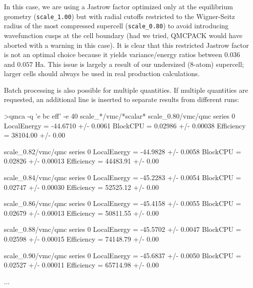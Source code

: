 In this case, we are using a Jastrow factor optimized only at the 
equilibrium geometry (\texttt{scale\_1.00}) but with radial 
cutoffs restricted to the Wigner-Seitz radius of the most compressed 
supercell (\texttt{scale\_0.80}) to avoid introducing wavefunction 
cusps at the cell boundary (had we tried, QMCPACK would have aborted with a warning in 
this case).  It is clear that this restricted Jastrow factor 
is not an optimal choice because it yields variance/energy ratios between $0.036$ 
and $0.057$ Ha.  This issue is largely a result of our undersized (8-atom) 
supercell; larger cells should always be used in real production 
calculations.

Batch processing is also possible for multiple quantities.  If multiple 
quantities are requested, an additional line is inserted to separate 
results from different runs:
\begin{shade}
>qmca -q 'e bc eff' -e 40 scale_*/vmc/*scalar*
scale_0.80/vmc/qmc  series 0 
  LocalEnergy           =          -44.6710 +/-           0.0061 
  BlockCPU              =           0.02986 +/-          0.00038 
  Efficiency            =          38104.00 +/-             0.00 

scale_0.82/vmc/qmc  series 0 
  LocalEnergy           =          -44.9828 +/-           0.0058 
  BlockCPU              =           0.02826 +/-          0.00013 
  Efficiency            =          44483.91 +/-             0.00 

scale_0.84/vmc/qmc  series 0 
  LocalEnergy           =          -45.2283 +/-           0.0054 
  BlockCPU              =           0.02747 +/-          0.00030 
  Efficiency            =          52525.12 +/-             0.00 

scale_0.86/vmc/qmc  series 0 
  LocalEnergy           =          -45.4158 +/-           0.0055 
  BlockCPU              =           0.02679 +/-          0.00013 
  Efficiency            =          50811.55 +/-             0.00 

scale_0.88/vmc/qmc  series 0 
  LocalEnergy           =          -45.5702 +/-           0.0047 
  BlockCPU              =           0.02598 +/-          0.00015 
  Efficiency            =          74148.79 +/-             0.00 

scale_0.90/vmc/qmc  series 0 
  LocalEnergy           =          -45.6837 +/-           0.0050 
  BlockCPU              =           0.02527 +/-          0.00011 
  Efficiency            =          65714.98 +/-             0.00 

...
\end{shade}



